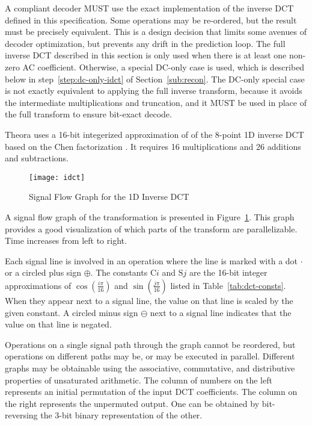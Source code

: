 \documentclass[9pt,letterpaper]{book}
\newcommand{\locvar}[1]{\ensuremath{\mathrm{#1}}}
\numberwithin{equation}{chapter}
\numberwithin{figure}{chapter}
\numberwithin{table}{chapter}
\begin{document}
A compliant decoder MUST use the exact implementation of the inverse DCT
 defined in this specification.
Some operations may be re-ordered, but the result must be precisely equivalent.
This is a design decision that limits some avenues of decoder optimization, but
 prevents any drift in the prediction loop.
The full inverse DCT described in this section is only used when there is at
 least one non-zero AC coefficient.
Otherwise, a special DC-only case is used, which is described below in
 step~\ref{step:dc-only-idct} of Section~\ref{sub:recon}.
The DC-only special case is not exactly equivalent to applying the full inverse
 transform, because it avoids the intermediate multiplications and truncation,
 and it MUST be used in place of the full transform to ensure bit-exact decode.

Theora uses a 16-bit integerized approximation of of the 8-point 1D inverse DCT
 based on the Chen factorization \cite{CSF77}.
It requires 16 multiplications and 26 additions and subtractions.

\begin{figure}[htbp]
\begin{center}
\texttt{[image: idct]}
\end{center}
\caption{Signal Flow Graph for the 1D Inverse DCT}
\label{fig:idct}
\end{figure}

A signal flow graph of the transformation is presented in
 Figure~\ref{fig:idct}.
This graph provides a good visualization of which parts of the transform are
 parallelizable.
Time increases from left to right.

Each signal line is involved in an operation where the line is marked with a
 dot $\cdot$ or a circled plus sign $\oplus$.
The constants $\locvar{C}i$ and $\locvar{S}j$ are the 16-bit integer
 approximations of $\cos(\frac{i\pi}{16})$ and $\sin(\frac{j\pi}{16})$ listed
 in Table~\ref{tab:dct-consts}.
When they appear next to a signal line, the value on that line is scaled by the
 given constant.
A circled minus sign $\ominus$ next to a signal line indicates that the value
 on that line is negated.

Operations on a single signal path through the graph cannot be reordered, but
 operations on different paths may be, or may be executed in parallel.
Different graphs may be obtainable using the associative, commutative, and
 distributive properties of unsaturated arithmetic.
The column of numbers on the left represents an initial permutation of the
 input DCT coefficients.
The column on the right represents the unpermuted output.
One can be obtained by bit-reversing the 3-bit binary representation of the
 other.
\end{document}
